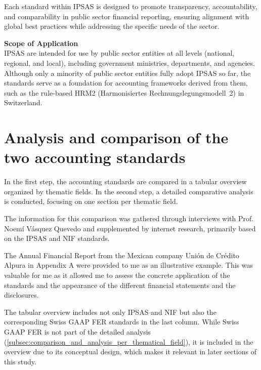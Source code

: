 \documentclass[10pt]{article}
\begin{document}
Each standard within IPSAS is designed to promote transparency, accountability, and comparability in public sector financial reporting, ensuring alignment with global best practices while addressing the specific needs of the sector.

\textbf{Scope of Application}\\
IPSAS are intended for use by public sector entities at all levels (national, regional, and local), including government ministries, departments, and agencies. Although only a minority of public sector entities fully adopt IPSAS so far, the standards serve as a foundation for accounting frameworks derived from them, such as the rule-based HRM2 (Harmonisiertes Rechnungslegungsmodell~2) in Switzerland.

\newpage

\section{Analysis and comparison of the two accounting standards}\label{sec:analysis_and_comparison_of_the_two_accounting_standards}
In the first step, the accounting standards are compared in a tabular overview organized by thematic fields. In the second step, a detailed comparative analysis is conducted, focusing on one section per thematic field.

The information for this comparison was gathered through interviews with Prof. Noemí Vásquez Quevedo and supplemented by internet research, primarily based on the IPSAS \cite{IPSASComoponents} and NIF \cite{NIFArchive} standards.

The Annual Financial Report from the Mexican company Unión de Crédito Alpura in Appendix A were provided to me as an illustrative example. This was valuable for me as it allowed me to assess the concrete application of the standards and the appearance of the different financial statements and the disclosures.

The tabular overview includes not only IPSAS and NIF but also the corresponding Swiss GAAP FER \cite{SwissGAAPFER} standards in the last column. While Swiss GAAP FER is not part of the detailed analysis (\vref{subsec:comparison_and_analysis_per_thematical_field}), it is included in the overview due to its conceptual design, which makes it relevant in later sections of this study.
\end{document}
